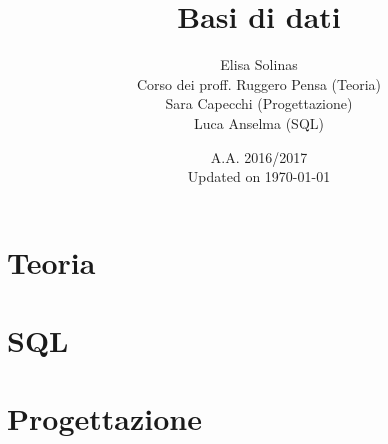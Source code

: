 \documentclass[12pt, oneside]{book}
\title{Basi di dati}
\author{Elisa Solinas \\
    Corso dei proff. Ruggero Pensa (Teoria)\\
    \large Sara Capecchi (Progettazione)\\
    \large Luca Anselma (SQL)}
\date{A.A. 2016/2017 
    \\Updated on \today}
\theoremstyle{plain}
\theoremstyle{definition}
\theoremstyle{remark}
\begin{document}
\maketitle
\tableofcontents

\part{Teoria}






\part{SQL}








\part{Progettazione}



\end{document}
